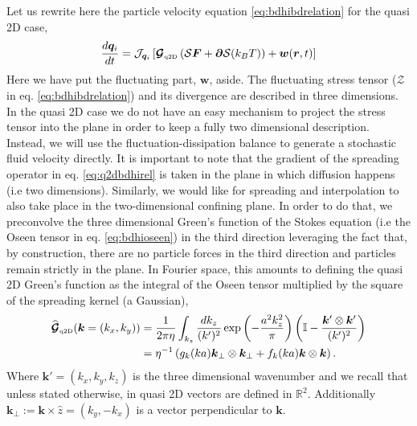 \documentclass[ twoside,openright,titlepage,numbers=noenddot,%
headinclude,footinclude,cleardoublepage=empty,abstract=on,
BCOR=5mm,paper=a4,fontsize=11pt, dvipsnames
]{scrreprt}
\renewcommand{\vec}[1]{\bm{#1}}
\newcommand{\tens}[1]{\bm{\mathcal{#1}}}
\newcommand{\oper}[1]{\mathcal{#1}}
\newcommand{\kT}{k_B T}
\newcommand{\fou}[1]{\widehat{#1}}
\newcommand{\ppos}{q}
\newcommand{\fpos}{r}
\newcommand{\qtd}{\text{\tiny q2D}}
\begin{document}
Let us rewrite here the particle velocity equation \eqref{eq:bdhibdrelation} for the quasi 2D case,
\begin{equation}
  \label{eq:q2dbdhirel}
  \frac{d\vec{\ppos}_i}{dt} = \oper{J}_{\vec{\ppos}_i}\left[\tens{G}_{\qtd}\left(\oper{S}\vec{F} + \vec{\partial}\oper{S}(\kT)\right) + \vec{w}(\vec{\fpos}, t)\right]
\end{equation}
Here we have put the fluctuating part, $\vec{w}$, aside. The fluctuating stress tensor ($\tens{Z}$ in eq. \eqref{eq:bdhibdrelation}) and its divergence are described in three dimensions. In the quasi 2D case we do not have an easy mechanism to project the stress tensor into the plane in order to keep a fully two dimensional description. Instead, we will use the fluctuation-dissipation balance to generate a stochastic fluid velocity directly.
It is important to note that the gradient of the spreading operator in eq. \eqref{eq:q2dbdhirel} is taken in the plane in which diffusion happens (i.e two dimensions). Similarly, we would like for spreading and interpolation to also take place in the two-dimensional confining plane.
In order to do that, we preconvolve the three dimensional Green's function of the Stokes equation (i.e the Oseen tensor in eq. \eqref{eq:bdhioseen})  in the third direction leveraging the fact that, by construction, there are no particle forces in the third direction and particles remain strictly in the plane. In Fourier space, this amounts to defining the quasi 2D Green's function as the integral of the Oseen tensor multiplied by the square of the spreading kernel (a Gaussian),
\begin{equation}
  \label{eq:q2dGreenintegral}
  \begin{aligned}
  \fou{\tens{G}}_{\qtd}(\vec{k} = (k_x, k_y)) &= \frac{1}{2\pi\eta}\int_{k_z} \frac{dk_z}{(k')^2}\exp\left(-\frac{a^2k_z^2}{\pi}\right)\left( \mathbb{I} - \frac{\vec{k}'\otimes\vec{k}'}{(k')^2}\right) \\
  &= \eta^{-1}\left(g_k(ka)\vec{k}_{\perp}\otimes\vec{k}_{\perp} + f_k(ka)\vec{k}\otimes\vec{k}\right).
\end{aligned}
\end{equation}
Where $\vec{k}' = (k_x, k_y, k_z)$ is the three dimensional wavenumber and we recall that unless stated otherwise, in quasi 2D vectors are defined in $\mathbb{R}^2$. Additionally $\vec{k}_\perp := \vec{k}\times\hat{z} = (k_y, -k_x)$ is a vector perpendicular to $\vec{k}$.
\end{document}
